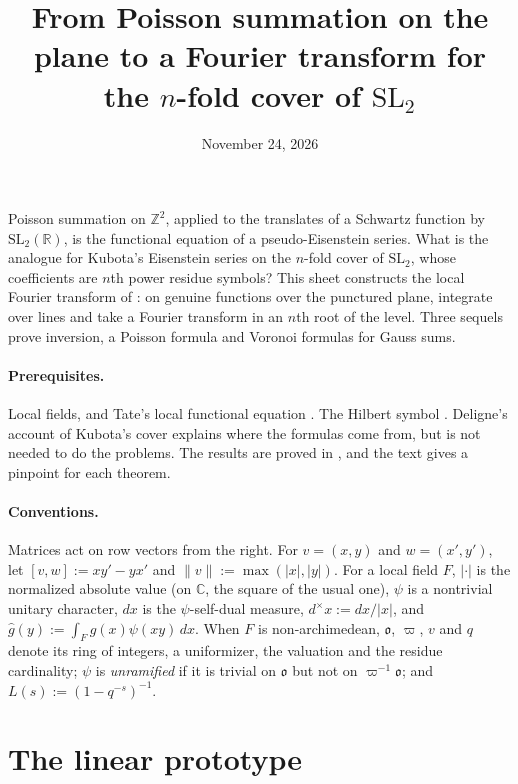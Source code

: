 \documentclass[reqno]{amsart}
\title[A Fourier transform for the $n$-fold cover of $\mathrm{SL}_2$]{From Poisson
  summation on the plane to a Fourier transform for the $n$-fold cover of
  $\mathrm{SL}_2$}
\author{}
\date{November 24, 2026}
\newcommand{\SL}{\mathrm{SL}_2}
\newcommand{\oo}{\mathfrak{o}}
\newcounter{chap}
\numberwithin{equation}{section}
\theoremstyle{definition}
\theoremstyle{plain}
\begin{document}
\maketitle
{}\label{chap}

Poisson summation on $\mathbb{Z}^2$, applied to the translates of a Schwartz function by $\mathrm{SL}_2(\mathbb{R})$, is the functional equation of a pseudo-Eisenstein series.  What is the analogue for Kubota's Eisenstein series on the $n$-fold cover of $\SL$, whose coefficients are $n$th power residue symbols?  This sheet constructs the local Fourier transform of \cite{N}: on genuine functions over the punctured plane, integrate over lines and take a Fourier transform in an $n$th root of the level.  Three sequels prove inversion, a Poisson formula and Voronoi formulas for Gauss sums.

\paragraph{Prerequisites.}
Local fields, and Tate's local functional equation \cite[Theorem~2.4.1]{Tate}.  The Hilbert symbol \cite[Ch.~V, \S3]{Neu}.  Deligne's account of Kubota's cover \cite{Del} explains where the formulas come from, but is not needed to do the problems.  The results are proved in \cite{N}, and the text gives a pinpoint for each theorem.

\paragraph{Conventions.}
Matrices act on row vectors from the right.  For $v = (x, y)$ and $w = (x', y')$, let $[v, w] := x y' - y x'$ and $\lVert v \rVert := \max(\lvert x \rvert, \lvert y \rvert)$.  For a local field $F$, $\lvert \cdot \rvert$ is the normalized absolute value (on $\mathbb{C}$, the square of the usual one), $\psi$ is a nontrivial unitary character, $d x$ is the $\psi$-self-dual measure, $d^\times x := d x / \lvert x \rvert$, and $\hat{g}(y) := \int_F g(x) \psi(x y) \, d x$.  When $F$ is non-archimedean, $\oo$, $\varpi$, $v$ and $q$ denote its ring of integers, a uniformizer, the valuation and the residue cardinality; $\psi$ is \emph{unramified} if it is trivial on $\oo$ but not on $\varpi^{-1} \oo$; and $L(s) := (1 - q^{-s})^{-1}$.


\section{The linear prototype}\label{sec:linear}
\end{document}
